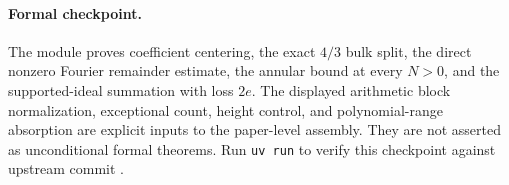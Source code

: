 \documentclass[11pt]{article}
\begin{document}
\paragraph{Formal checkpoint.}
The module  proves coefficient
centering, the exact $4/3$ bulk split, the direct nonzero Fourier
remainder estimate, the annular bound at every $N>0$, and the
supported-ideal summation with loss $2e$. The displayed arithmetic
block normalization, exceptional count, height control, and
polynomial-range absorption are explicit inputs to the paper-level
assembly. They are not asserted as unconditional formal theorems.
Run \texttt{uv run}  to verify this checkpoint
against upstream commit
.
\end{document}
